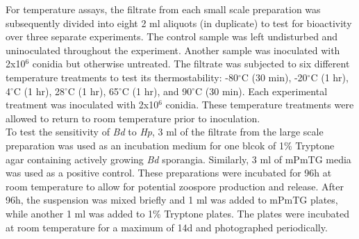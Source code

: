 \indent For temperature assays, the filtrate from each small scale preparation was subsequently divided into eight 2 ml aliquots (in duplicate) to test for bioactivity over three separate experiments. The control sample was left undisturbed and uninoculated throughout the experiment. Another sample was inoculated with 2x10$^{6}$ conidia but otherwise untreated. The filtrate was subjected to six different temperature treatments to test its thermostability: -80$^{\circ}$C (30 min), -20$^{\circ}$C (1 hr), 4$^{\circ}$C (1 hr), 28$^{\circ}$C (1 hr), 65$^{\circ}$C (1 hr), and 90$^{\circ}$C (30 min). Each experimental treatment was inoculated with 2x10$^{6}$ conidia. These temperature treatments were allowed to return to room temperature prior to inoculation.\\
\indent To test the sensitivity of \textit{Bd} to \textit{Hp}, 3 ml of the filtrate from the large scale preparation was used as an incubation medium for one blcok of 1\% Tryptone agar containing actively growing \textit{Bd} sporangia. Similarly, 3 ml of mPmTG media was used as a positive control. These preparations were incubated for 96h at room temperature to allow for potential zoospore production and release. After 96h, the suspension was mixed briefly and 1 ml was added to mPmTG plates, while another 1 ml was added to 1\% Tryptone plates. The plates were incubated at room temperature for a maximum of 14d and photographed periodically.\\

